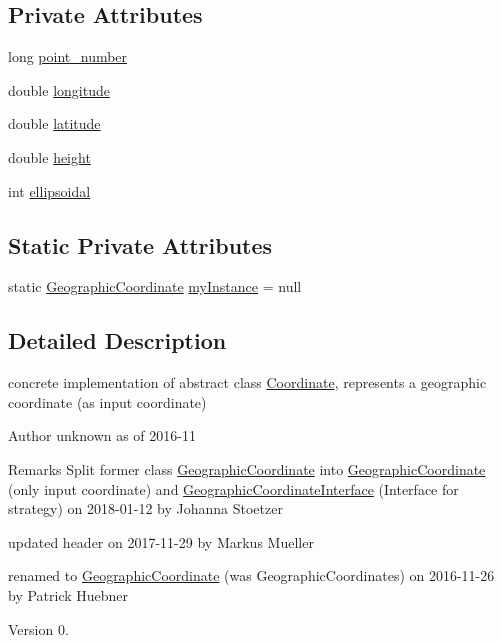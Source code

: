 \subsection*{Private Attributes}
\begin{DoxyCompactItemize}
\item 
long \hyperlink{classcoordinates_1_1_geographic_coordinate_a7d7384b678b1b189a8a023653f9d3c19}{point\+\_\+number}
\item 
double \hyperlink{classcoordinates_1_1_geographic_coordinate_a1ffbbfc5c01ab766af1d32bcc8cb42ad}{longitude}
\item 
double \hyperlink{classcoordinates_1_1_geographic_coordinate_a07a18abcc3cd691d4d8821a875dabbd6}{latitude}
\item 
double \hyperlink{classcoordinates_1_1_geographic_coordinate_a928334b65b117d99cd724d2c0b9b7ee0}{height}
\item 
int \hyperlink{classcoordinates_1_1_geographic_coordinate_ab14ea3abf8e94174e4eff69ab983282e}{ellipsoidal}
\end{DoxyCompactItemize}
\subsection*{Static Private Attributes}
\begin{DoxyCompactItemize}
\item 
static \hyperlink{classcoordinates_1_1_geographic_coordinate}{Geographic\+Coordinate} \hyperlink{classcoordinates_1_1_geographic_coordinate_a53dc73fad8c6e068de7792a5c886f78f}{my\+Instance} = null
\end{DoxyCompactItemize}


\subsection{Detailed Description}
concrete implementation of abstract class \hyperlink{classcoordinates_1_1_coordinate}{Coordinate}, represents a geographic coordinate (as input coordinate)~\newline
 

\begin{DoxyAuthor}{Author}
unknown as of 2016-\/11 
\end{DoxyAuthor}
\begin{DoxyRemark}{Remarks}
Split former class \hyperlink{classcoordinates_1_1_geographic_coordinate}{Geographic\+Coordinate} into \hyperlink{classcoordinates_1_1_geographic_coordinate}{Geographic\+Coordinate} (only input coordinate) and \hyperlink{classcoordinates_1_1_geographic_coordinate_interface}{Geographic\+Coordinate\+Interface} (Interface for strategy) on 2018-\/01-\/12 by Johanna Stoetzer 

updated header on 2017-\/11-\/29 by Markus Mueller 

renamed to \hyperlink{classcoordinates_1_1_geographic_coordinate}{Geographic\+Coordinate} (was Geographic\+Coordinates) on 2016-\/11-\/26 by Patrick Huebner 
\end{DoxyRemark}
\begin{DoxyVersion}{Version}
0. 
\end{DoxyVersion}

